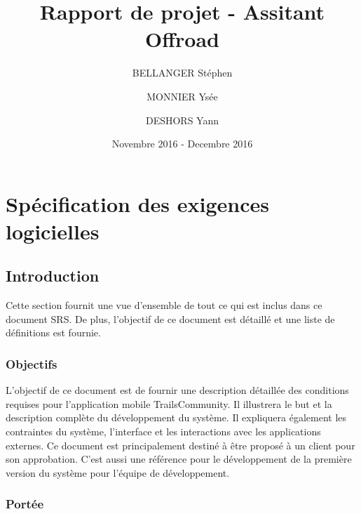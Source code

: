 \documentclass[titlepage, 12pt]{report}
\title{Rapport de projet - Assitant Offroad}
\author{BELLANGER Stéphen \and
			MONNIER Ysée \and
			DESHORS Yann}
\date{Novembre 2016 - Decembre 2016}
\begin{document}
	
\maketitle

\tableofcontents

\listoffigures 

\part{Spécification des exigences logicielles}

\chapter{Introduction}

Cette section fournit  une vue d'ensemble de tout ce qui est inclus dans ce document SRS. De plus, l'objectif de ce document est détaillé et une liste de définitions est fournie.

\section{Objectifs}

L'objectif de ce document est de fournir une description détaillée des conditions requises pour l'application mobile TrailsCommunity.
Il illustrera le but et la description complète du développement du système.
Il expliquera également les contraintes du système, l'interface et les interactions avec les applications externes. Ce document est principalement destiné à être proposé à un client pour son approbation. C'est aussi une référence pour le développement de la première version du système pour l'équipe de développement.

\section{Portée}
\end{document}
